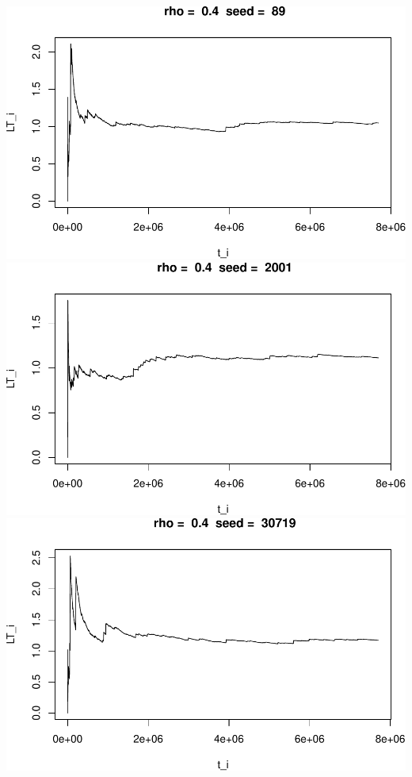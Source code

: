 \documentclass[]{article}
\begin{document}
\includegraphics{003_files/figure-latex/unnamed-chunk-15-7.pdf}
\includegraphics{003_files/figure-latex/unnamed-chunk-15-8.pdf}
\includegraphics{003_files/figure-latex/unnamed-chunk-15-9.pdf}
\end{document}
